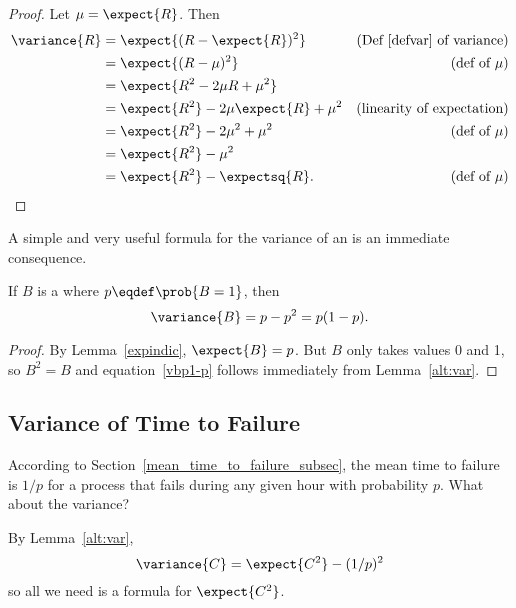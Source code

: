 \begin{proof}
Let $\mu = \expect{R}$.  Then
\begin{align*}
\variance{R} & =   \expect{(R - \expect{R})^2}
               & \text{(Def~\ref{defvar} of variance)}\\
        & = \expect{(R - \mu)^2} & \text{(def of $\mu$)}\\
        & = \expect{R^2 - 2  \mu R + \mu^2} \\
        & = \expect{R^2} - 2 \mu \expect{R} + \mu^2 
                & \text{(linearity of expectation)}\\
        & = \expect{R^2} - 2 \mu^2 + \mu^2
              &  \text{(def of $\mu$)}\\
        & = \expect{R^2} - \mu^2\\
        & = \expect{R^2} - \expectsq{R}.
                  &  \text{(def of $\mu$)}
\end{align*}
\end{proof}

A simple and very useful formula for the variance of an  is an immediate consequence.
\begin{corollary}\label{bernoulli-variance}
If $B$ is a  where $p\eqdef
\prob{B=1}$, then
\begin{equation}\label{vbp1-p}
\variance{B} = p-p^2 = p(1-p).
\end{equation}
\begin{proof}
  By Lemma~\ref{expindic}, $\expect{B}= p$.  But $B$ only takes
  values 0 and 1, so $B^2 = B$ and equation~\eqref{vbp1-p} follows
  immediately from Lemma~\ref{alt:var}.
\end{proof}

\end{corollary}

\subsection{Variance of Time to Failure}
According to Section~\ref{mean_time_to_failure_subsec}, the mean time
to failure is $1/p$ for a process that fails during any given hour
with probability $p$.  What about the variance?

By Lemma~\ref{alt:var},
\begin{equation}\label{varCEC2}
\variance{C} = \expect{C^2} - (1/p)^2
\end{equation}
so all we need is a formula for $\expect{C^2}$.


